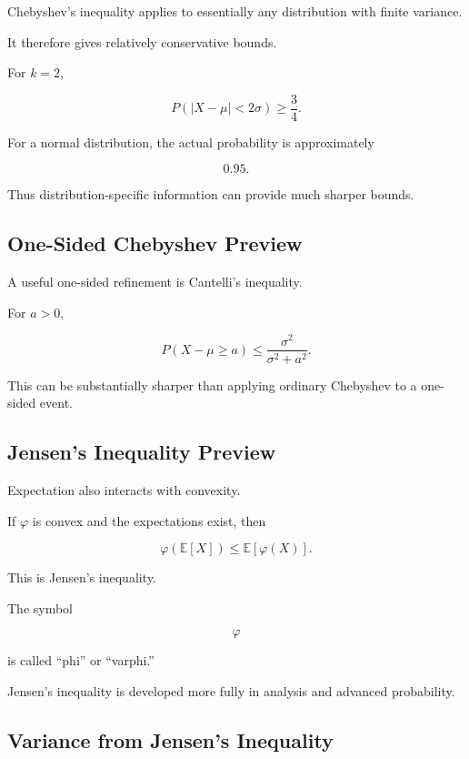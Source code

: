 Chebyshev's inequality applies to essentially any distribution with
finite variance.

It therefore gives relatively conservative bounds.

For \(k=2\),

\[
P(|X-\mu|<2\sigma)
\geq
\frac34.
\]

For a normal distribution, the actual probability is approximately

\[
0.95.
\]

Thus distribution-specific information can provide much sharper bounds.

\subsection{One-Sided Chebyshev Preview}
\label{subsec:cantelli-preview}

A useful one-sided refinement is Cantelli's inequality.

For \(a>0\),

\[
\boxed{
P(X-\mu\geq a)
\leq
\frac{
\sigma^2
}{
\sigma^2+a^2
}.
}
\]

This can be substantially sharper than applying ordinary Chebyshev to a
one-sided event.

\subsection{Jensen's Inequality Preview}
\label{subsec:jensen-preview}

Expectation also interacts with convexity.

If \(\varphi\) is convex and the expectations exist, then

\[
\boxed{
\varphi(\mathbb{E}[X])
\leq
\mathbb{E}[\varphi(X)].
}
\]

This is Jensen's inequality.

The symbol

\[
\varphi
\]

is called ``phi'' or ``varphi.''

Jensen's inequality is developed more fully in analysis and advanced
probability.

\subsection{Variance from Jensen's Inequality}
\label{subsec:variance-jensen}

